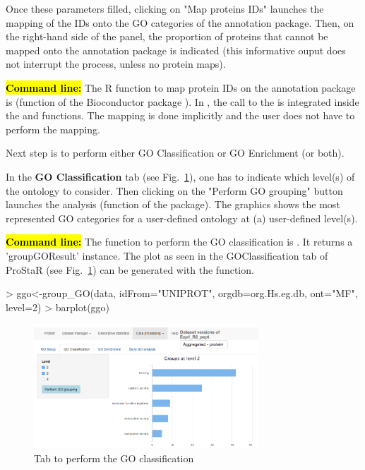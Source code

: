 \documentclass[12pt]{article}
\begin{document}
{Once these parameters filled, clicking on "Map proteins IDs" launches the  mapping
of the IDs onto the GO categories of the annotation package. 
Then, on the right-hand side of the panel, 
the proportion of proteins that cannot be mapped onto the annotation package
is indicated (this informative ouput does not interrupt the process, unless no 
protein maps). 


\hl{\bf Command line:} The R function to map protein IDs on the annotation 
package is  (function of the Bioconductor package 
). 
In , the call to the  is integrated inside the 
 and  functions. The mapping is 
done implicitly and the user does not have to perform the mapping. 



Next step is to perform either GO Classification or GO Enrichment (or both). 

In the \textbf{GO Classification} tab (see Fig.~\ref{fig:GO_tab2}), one has to 
indicate which level(s) of the ontology to consider.
Then clicking on the "Perform GO grouping" button launches the analysis 
(function  of the  package). 
The graphics shows the most represented GO categories for a user-defined 
ontology at (a) user-defined level(s).


\hl{\bf Command line:} The  function to perform the GO 
classification is . It returns a 'groupGOResult' instance.
The plot as seen in the GOClassification tab of ProStaR 
(see Fig.~\ref{fig:GO_tab2}) can be generated with the  
function. 

\begin{Schunk}
\begin{Sinput}
> ggo<-group_GO(data, idFrom="UNIPROT", orgdb=org.Hs.eg.db, ont="MF", level=2)
> barplot(ggo)
\end{Sinput}
\end{Schunk}


\begin {figure}
\centering
\includegraphics[width=0.75\textwidth]{images/GO_tab2.png}
\caption{Tab to perform the GO classification}\label{fig:GO_tab2}
\end {figure}

}
\end{document}
